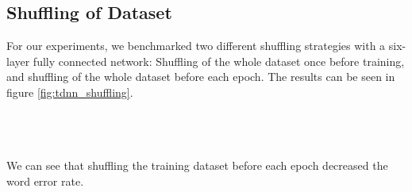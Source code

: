 \subsection{Shuffling of Dataset}
For our experiments, we benchmarked two different shuffling strategies with a six-layer fully connected network: Shuffling of the whole dataset once before training, and shuffling of the whole dataset before each epoch. The results can be seen in figure \ref{fig:tdnn_shuffling}. \\ \\
\begin{minipage}{\linewidth}
	\centering
	\label{fig:tdnn_shuffling}
\end{minipage} \\ \\
We can see that shuffling the training dataset before each epoch decreased the word error rate. \\
